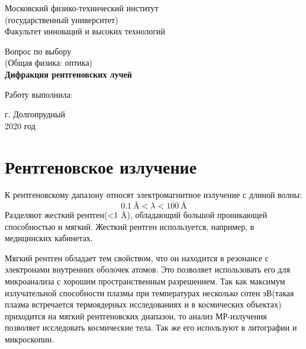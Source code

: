 \documentclass[12pt]{kiarticle} %
\begin{document}
	
	\begin{titlepage}
	\begin{center}
		\large 	Московский физико-технический институт \\
		(государственный университет) \\
		Факультет инноваций и высоких технологий \\
		\vspace{0.2cm}
		
		\vspace{4.5cm}
		Вопрос по выбору \\ \vspace{0.2cm}
		\large (Общая физика: оптика) \\ \vspace{0.2cm}
		\LARGE \textbf{Дифракция рентгеновских лучей}
	\end{center}
	\vspace{2.3cm} \large
	
	\begin{center}
		Работу выполнила: \\
		\vspace{10mm}		
		
	\end{center}
	
	\begin{center} \vspace{80mm}
		г. Долгопрудный \\
		2020 год
	\end{center}
\end{titlepage}




\section{Рентгеновское излучение}
К рентгеновскому дапазону относят электромагнитное излучение с длиной волны:
\[ 0.1 \ \text{\AA} < \lambda < 100 \ \text{\AA} \]
Разделяют жесткий рентген(<1 \AA), обладающий большой проникающей способностью и мягкий. Жесткий рентген используется, например, в медицинских кабинетах.

Мягкий рентген обладает тем свойством, что он находится в резонансе с электронами внутренних оболочек атомов. Это позволяет использовать его для микроанализа с хорошим пространственным разрешением. Так как максимум излучательной способности плазмы при температурах несколько сотен эВ(такая плазма встречается термоядерных исследованиях и в космических объектах) приходится на мягкий рентгеновских диапазон, то анализ МР-излучения позволяет исследовать космические тела. Так же его используют в литографии и микроскопии.
\end{document}
